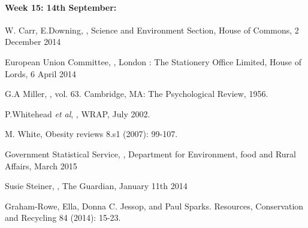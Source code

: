 \documentclass[a4paper, 11pt]{article}
\begin{document}
\paragraph{\textbf{Week 15: 14th September:	}} 

\fi
\clearpage


\begin{thebibliography}{29}

W. Carr, E.Downing, \emph{}, Science and Environment Section, House of Commons, 2 December 2014
\vspace{\baselineskip}

European Union Committee, \emph{}, London : The Stationery Office Limited, House of Lords, 6 April 2014
\vspace{\baselineskip}

G.A Miller, \emph{}, vol. 63. Cambridge, MA: The Psychological Review, 1956.
\vspace{\baselineskip}

P.Whitehead \emph{et al}, \emph{}, WRAP, July 2002.
\vspace{\baselineskip}

M. White, \emph{} Obesity reviews 8.s1 (2007): 99-107.
\vspace{\baselineskip}

Government Statistical Service, \emph{}, Department for Environment, food and Rural Affairs, March 2015
\vspace{\baselineskip}

Susie Steiner, \emph{}, The Guardian, January 11th 2014
\vspace{\baselineskip}

Graham-Rowe, Ella, Donna C. Jessop, and Paul Sparks.\emph{} Resources, Conservation and Recycling 84 (2014): 15-23.
\vspace{\baselineskip}


\end{thebibliography}
\end{document}
